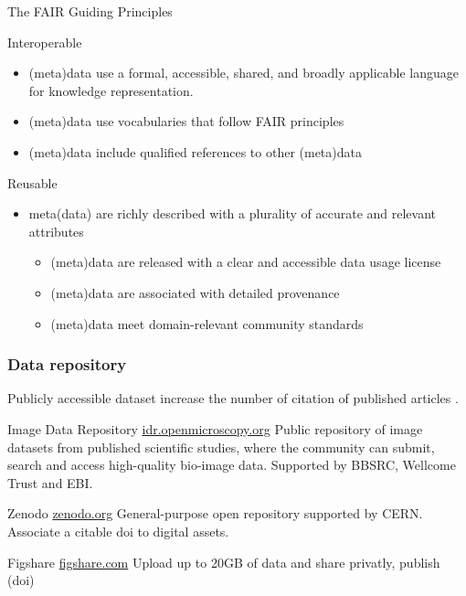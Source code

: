 \documentclass[ignorenonframetext,aspectratio=169,10pt,xcolor=table]{beamer}
\begin{document}
\begin{frame}{The FAIR Guiding Principles}
  \begin{block}{Interoperable}
    \begin{itemize}
    \item (meta)data use a formal, accessible, shared, and broadly applicable language for knowledge representation.
    \item (meta)data use vocabularies that follow FAIR principles
    \item (meta)data include qualified references to other (meta)data
    \end{itemize}
  \end{block}

  \begin{block}{Reusable}
    \begin{itemize}
    \item meta(data) are richly described with a plurality of accurate and relevant attributes
      \begin{itemize}
      \item (meta)data are released with a clear and accessible data usage license
      \item (meta)data are associated with detailed provenance
      \item (meta)data meet domain-relevant community standards
      \end{itemize}
    \end{itemize}
  \end{block}


\end{frame}


\begin{frame} \frametitle{Data repository}

  Publicly accessible dataset increase the number of citation of published
  articles .

  \begin{block}{Image Data Repository \url{idr.openmicroscopy.org}}
    Public repository of image datasets from published scientific studies, where
    the community can submit, search and access high-quality bio-image data.
    Supported by BBSRC, Wellcome Trust and EBI.
  \end{block}

  \begin{block}{Zenodo \url{zenodo.org}}
    General-purpose open repository supported by CERN. Associate a citable doi
    to digital assets.
  \end{block}

  \begin{block}{Figshare \url{figshare.com}}
    Upload up to 20GB of data and share privatly, publish (doi)
  \end{block}


\end{frame}
\end{document}
